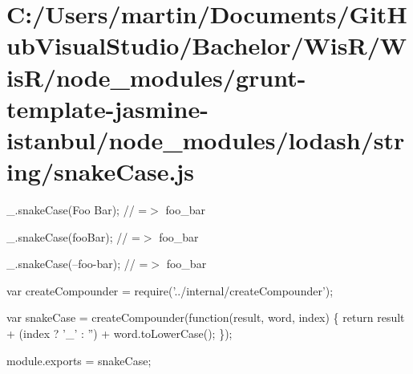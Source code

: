 \hypertarget{_c_1_2_users_2martin_2_documents_2_git_hub_visual_studio_2_bachelor_2_wis_r_2_wis_r_2node_moduleecd1498d65801c0d5530f57e7e5652d8}{}\section{C\+:/\+Users/martin/\+Documents/\+Git\+Hub\+Visual\+Studio/\+Bachelor/\+Wis\+R/\+Wis\+R/node\+\_\+modules/grunt-\/template-\/jasmine-\/istanbul/node\+\_\+modules/lodash/string/snake\+Case.\+js}
\+\_\+.\+snake\+Case(\textquotesingle{}Foo Bar\textquotesingle{}); // =$>$ \textquotesingle{}foo\+\_\+bar\textquotesingle{}

\+\_\+.\+snake\+Case(\textquotesingle{}foo\+Bar\textquotesingle{}); // =$>$ \textquotesingle{}foo\+\_\+bar\textquotesingle{}

\+\_\+.\+snake\+Case(\textquotesingle{}--foo-\/bar\textquotesingle{}); // =$>$ \textquotesingle{}foo\+\_\+bar\textquotesingle{}


\begin{DoxyCodeInclude}
var createCompounder = require(\textcolor{stringliteral}{'../internal/createCompounder'});

var snakeCase = createCompounder(\textcolor{keyword}{function}(result, word, index) \{
  \textcolor{keywordflow}{return} result + (index ? \textcolor{charliteral}{'\_'} : \textcolor{stringliteral}{''}) + word.toLowerCase();
\});

module.exports = snakeCase;
\end{DoxyCodeInclude}
 